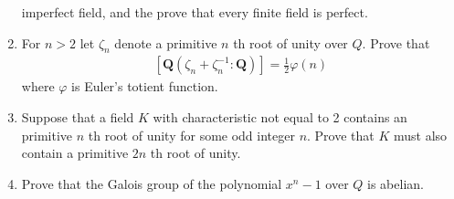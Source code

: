 \begin{enumerate}
  imperfect field, and the prove that every finite field is perfect.
\item
  For \(n>2\) let \(\zeta_{n}\) denote a primitive \(n\) th root of
  unity over \(Q\). Prove that
  \begin{align*}
  \left[\boldsymbol{Q}\left(\zeta_{n}+\zeta_{n}^{-1}: \boldsymbol{Q}\right)\right]=\frac{1}{2} \varphi(n)
  \end{align*}
  where \(\varphi\) is Euler's totient function.
\item
  Suppose that a field \(K\) with characteristic not equal to 2 contains
  an primitive \(n\) th root of unity for some odd integer \(n\). Prove
  that \(K\) must also contain a primitive \(2 n\) th root of unity.
\item
  Prove that the Galois group of the polynomial \(x^{n}-1\) over \(Q\)
  is abelian.
\end{enumerate}


\printbibliography[title=Bibliography]



